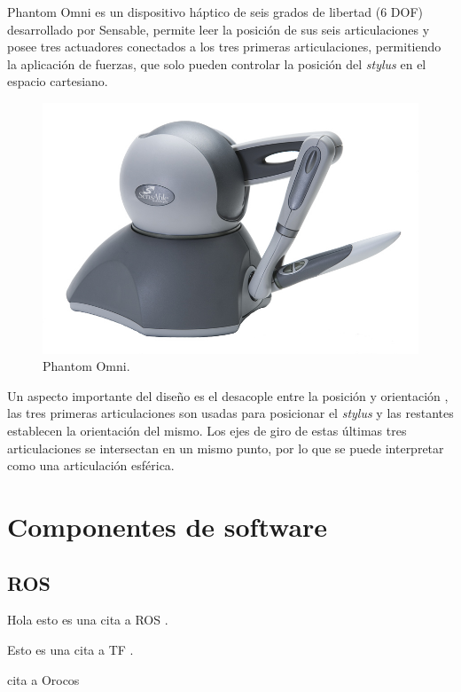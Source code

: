 Phantom Omni es un dispositivo háptico de seis grados de libertad (6 DOF) desarrollado por Sensable, permite leer la posición de sus seis articulaciones y posee tres actuadores conectados a los tres primeras articulaciones, permitiendo la aplicación de fuerzas, que solo pueden controlar la posición del \textit{stylus} en el espacio cartesiano.

\begin{figure}[ht]
  \centering
  \includegraphics[scale=.2]{img/cap2/phantom_omni}
  \caption{Phantom Omni.}
  \label{cap2_phantom}
\end{figure}

Un aspecto importante del diseño es el desacople entre la posición y orientación \cite{beckman2007}, las tres primeras articulaciones son usadas para posicionar el \textit{stylus} y las restantes establecen la orientación del mismo. Los ejes de giro de estas últimas tres articulaciones se intersectan en un mismo punto, por lo que se puede interpretar como una articulación esférica.


\section{Componentes de software}

\subsection{ROS}

Hola esto es una cita a ROS \cite{quigley2009}.



Esto es una cita a TF \cite{foote2013}.

cita a Orocos \cite{orocos2001}

\cite{craig1989}

\cite{gier2015}

\cite{diankov2010}


